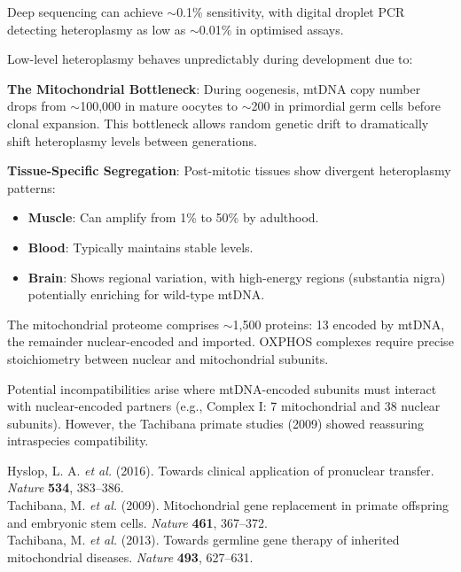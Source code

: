 \begin{technical}
Deep sequencing can achieve $\sim$0.1\% sensitivity, with digital droplet PCR detecting heteroplasmy as low as $\sim$0.01\% in optimised assays.


Low-level heteroplasmy behaves unpredictably during development due to:

\textbf{The Mitochondrial Bottleneck}: During oogenesis, mtDNA copy number drops from $\sim$100,000 in mature oocytes to $\sim$200 in primordial germ cells before clonal expansion. This bottleneck allows random genetic drift to dramatically shift heteroplasmy levels between generations.

\textbf{Tissue-Specific Segregation}: Post-mitotic tissues show divergent heteroplasmy patterns:
\begin{itemize}[leftmargin=*]
\item \textbf{Muscle}: Can amplify from 1\% to 50\% by adulthood.
\item \textbf{Blood}: Typically maintains stable levels.
\item \textbf{Brain}: Shows regional variation, with high-energy regions (substantia nigra) potentially enriching for wild-type mtDNA.
\end{itemize}



The mitochondrial proteome comprises ${\sim}$1,500 proteins: 13 encoded by mtDNA, the remainder nuclear-encoded and imported. OXPHOS complexes require precise stoichiometry between nuclear and mitochondrial subunits.

Potential incompatibilities arise where mtDNA-encoded subunits must interact with nuclear-encoded partners (e.g., Complex I: 7 mitochondrial and 38 nuclear subunits). However, the Tachibana primate studies (2009) showed reassuring intraspecies compatibility.

\techref
{\footnotesize
Hyslop, L. A. \textit{et al.} (2016). Towards clinical application of pronuclear transfer. \textit{Nature} \textbf{534}, 383–386.\\
Tachibana, M. \textit{et al.} (2009). Mitochondrial gene replacement in primate offspring and embryonic stem cells. \textit{Nature} \textbf{461}, 367–372.\\
Tachibana, M. \textit{et al.} (2013). Towards germline gene therapy of inherited mitochondrial diseases. \textit{Nature} \textbf{493}, 627–631.
}
\end{technical}